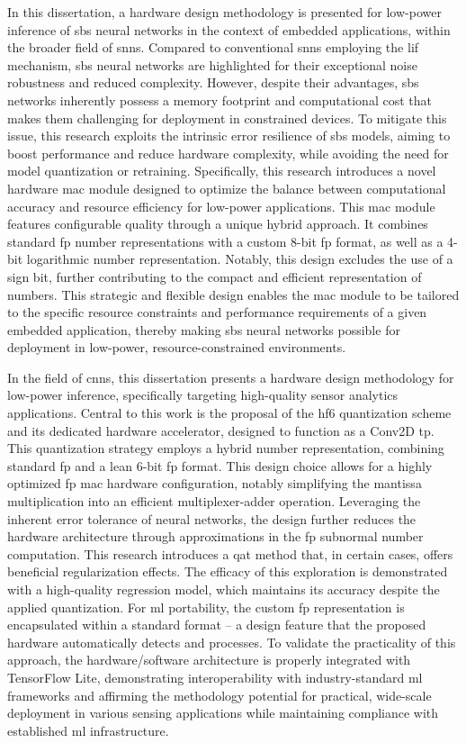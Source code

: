 In this dissertation, a hardware design methodology is presented for low-power inference of \gls{sbs} neural networks in the context of embedded applications, within the broader field of \glspl{snn}. Compared to conventional \glspl{snn} employing the \gls{lif} mechanism, \gls{sbs} neural networks are highlighted for their exceptional noise robustness and reduced complexity. However, despite their advantages, \gls{sbs} networks inherently possess a memory footprint and computational cost that makes them challenging for deployment in constrained devices. To mitigate this issue, this research exploits the intrinsic error resilience of \gls{sbs} models, aiming to boost performance and reduce hardware complexity, while avoiding the need for model quantization or retraining. Specifically, this research introduces a novel hardware \gls{mac} module designed to optimize the balance between computational accuracy and resource efficiency for low-power applications. This \gls{mac} module features configurable quality through a unique hybrid approach. It combines standard \gls{fp} number representations with a custom 8-bit \gls{fp} format, as well as a 4-bit logarithmic number representation. Notably, this design excludes the use of a sign bit, further contributing to the compact and efficient representation of numbers. This strategic and flexible design enables the \gls{mac} module to be tailored to the specific resource constraints and performance requirements of a given embedded application, thereby making \gls{sbs} neural networks possible for deployment in low-power, resource-constrained environments.

In the field of \glspl{cnn}, this dissertation presents a hardware design methodology for low-power inference, specifically targeting high-quality sensor analytics applications. Central to this work is the proposal of the \gls{hf6} quantization scheme and its dedicated hardware accelerator, designed to function as a Conv2D \gls{tp}. This quantization strategy employs a hybrid number representation, combining standard \gls{fp} and a lean 6-bit \gls{fp} format. This design choice allows for a highly optimized \gls{fp} \gls{mac} hardware configuration, notably simplifying the mantissa multiplication into an efficient multiplexer-adder operation. Leveraging the inherent error tolerance of neural networks, the design further reduces the hardware architecture through approximations in the \gls{fp} subnormal number computation. This research introduces a \gls{qat} method that, in certain cases, offers beneficial regularization effects. The efficacy of this exploration is demonstrated with a high-quality regression model, which maintains its accuracy despite the applied quantization. For \gls{ml} portability, the custom \gls{fp} representation is encapsulated within a standard format -- a design feature that the proposed hardware automatically detects and processes. To validate the practicality of this approach, the hardware/software architecture is properly integrated with TensorFlow Lite, demonstrating interoperability with industry-standard \gls{ml} frameworks and affirming the methodology potential for practical, wide-scale deployment in various sensing applications while maintaining compliance with established \gls{ml} infrastructure.


